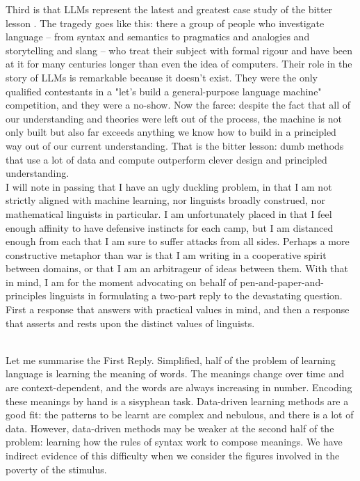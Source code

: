 Third is that LLMs represent the latest and greatest case study of the bitter lesson \cite{}. The tragedy goes like this: there a group of people who investigate language -- from syntax and semantics to pragmatics and analogies and storytelling and slang -- who treat their subject with formal rigour and have been at it for many centuries longer than even the idea of computers. Their role in the story of LLMs is remarkable because it doesn't exist. They were the only qualified contestants in a "let's build a general-purpose language machine" competition, and they were a no-show. Now the farce: despite the fact that all of our understanding and theories were left out of the process, the machine is not only built but also far exceeds anything we know how to build in a principled way out of our current understanding. That is the bitter lesson: dumb methods that use a lot of data and compute outperform clever design and principled understanding.\\

I will note in passing that I have an ugly duckling problem, in that I am not strictly aligned with machine learning, nor linguists broadly construed, nor mathematical linguists in particular. I am unfortunately placed in that I feel enough affinity to have defensive instincts for each camp, but I am distanced enough from each that I am sure to suffer attacks from all sides. Perhaps a more constructive metaphor than war is that I am writing in a cooperative spirit between domains, or that I am an arbitrageur of ideas between them. With that in mind, I am for the moment advocating on behalf of pen-and-paper-and-principles linguists in formulating a two-part reply to the devastating question. First a response that answers with practical values in mind, and then a response that asserts and rests upon the distinct values of linguists.

\\
Let me summarise the First Reply. Simplified, half of the problem of learning language is learning the meaning of words. The meanings change over time and are  context-dependent, and the words are always increasing in number. Encoding these meanings by hand is a sisyphean task. Data-driven learning methods are a good fit: the patterns to be learnt are complex and nebulous, and there is a lot of data. However, data-driven methods may be weaker at the second half of the problem: learning how the rules of syntax work to compose meanings. We have indirect evidence of this difficulty when we consider the figures involved in the poverty of the stimulus.\\

